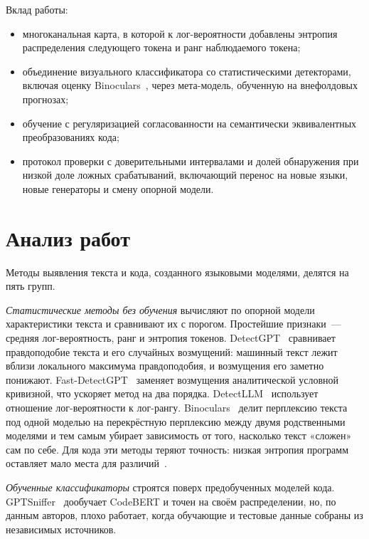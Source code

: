 \documentclass{misisarticle}
\begin{document}
Вклад работы:
\begin{itemize}
  \item многоканальная карта, в которой к лог-вероятности добавлены энтропия распределения следующего токена и ранг наблюдаемого токена;
  \item объединение визуального классификатора со статистическими детекторами, включая оценку Binoculars~\cite{binoculars}, через мета-модель, обученную на внефолдовых прогнозах;
  \item обучение с регуляризацией согласованности на семантически эквивалентных преобразованиях кода;
  \item протокол проверки с доверительными интервалами и долей обнаружения при низкой доле ложных срабатываний, включающий перенос на новые языки, новые генераторы и смену опорной модели.
\end{itemize}

\section{Анализ работ}

Методы выявления текста и кода, созданного языковыми моделями, делятся на пять групп.

\textit{Статистические методы без обучения} вычисляют по опорной модели характеристики текста и сравнивают их с порогом. Простейшие признаки~--- средняя лог-вероятность, ранг и энтропия токенов. DetectGPT~\cite{detectgpt} сравнивает правдоподобие текста и его случайных возмущений: машинный текст лежит вблизи локального максимума правдоподобия, и возмущения его заметно понижают. Fast-DetectGPT~\cite{fastdetectgpt} заменяет возмущения аналитической условной кривизной, что ускоряет метод на два порядка. DetectLLM~\cite{detectllm} использует отношение лог-вероятности к лог-рангу. Binoculars~\cite{binoculars} делит перплексию текста под одной моделью на перекрёстную перплексию между двумя родственными моделями и тем самым убирает зависимость от того, насколько текст «сложен» сам по себе. Для кода эти методы теряют точность: низкая энтропия программ оставляет мало места для различий~\cite{zeroshotcode}.

\textit{Обученные классификаторы} строятся поверх предобученных моделей кода. GPTSniffer~\cite{gptsniffer} дообучает CodeBERT и точен на своём распределении, но, по данным авторов, плохо работает, когда обучающие и тестовые данные собраны из независимых источников.
\end{document}
